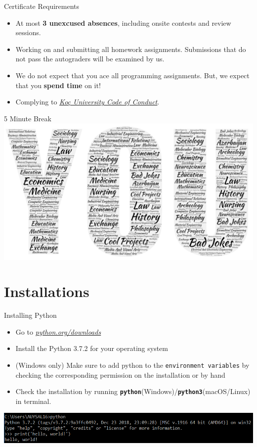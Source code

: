 		\begin{frame}{Certificate Requirements}
			\begin{itemize}
				\LARGE
				\item At most \textbf{3 unexcused absences}, including onsite contests and review sessions.
				\item Working on and submitting all homework assignments. Submissions that do not pass the autograders will be examined by us.
				\item We do not expect that you ace all programming assignments. But, we expect that you \textbf{spend time} on it!
				\item Complying to \href{https://vpaa.ku.edu.tr/academic/student-code-of-conduct}{\underline{\textit{Koç University Code of Conduct}}}. 
			\end{itemize}
		\end{frame}


		\begin{frame}{5 Minute Break}
			\centering
			\includegraphics[width=\textwidth]{images/you_wordart.png}
		\end{frame}

	\section{Installations}

	 	\begin{frame}{Installing Python}
			\LARGE
			\begin{itemize}
				\item Go to \href{https://www.python.org/downloads/}{\underline{\textit{python.org/downloads}}}
				\item Install the Python 3.7.2 for your operating system
				\item (Windows only) Make sure to add python to the \texttt{environment variables} by checking the corresponding permission on the installation or by hand
				\item Check the installation by running \textbf{\texttt{python}}(Windows)/\textbf{\texttt{python3}}(macOS/Linux) in terminal.
			\end{itemize}
			\includegraphics[width=\textwidth]{images/cmd_helloworld.png}
		\end{frame}
		 
